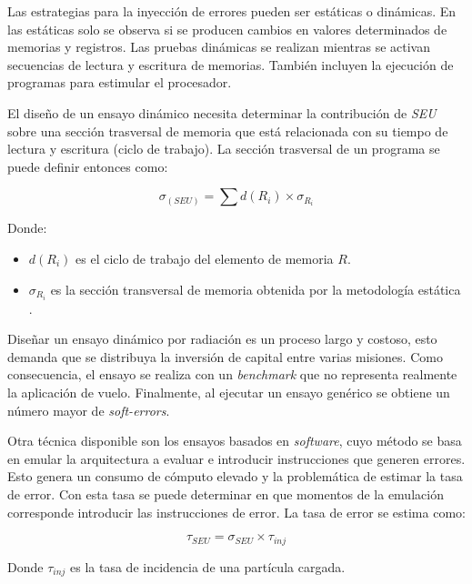 
Las estrategias para la inyección de errores pueden ser estáticas o dinámicas.
En las estáticas solo se observa si se producen cambios en valores determinados de memorias y registros.
Las pruebas dinámicas se realizan mientras se activan secuencias de lectura y escritura de memorias.
También incluyen la ejecución de programas para estimular el procesador.

El diseño de un ensayo dinámico necesita determinar la contribución de \emph{SEU} sobre una sección trasversal de memoria que está relacionada con su tiempo de lectura y escritura (ciclo de trabajo).
La sección trasversal de un programa se puede definir entonces como:

\begin{equation}
	\label{eq:crosssection}
    \sigma_{(SEU)} = \sum{d(R_i) \times \sigma_{R_i}}
\end{equation}

Donde:
\begin{itemize}
    \item $ d(R_i) $ es el ciclo de trabajo del elemento de memoria $ R $.
    \item $ \sigma_{R_i} $ es la sección transversal de memoria obtenida por la metodología estática \citep{ARTICLE:velazco}.
\end{itemize}

Diseñar un ensayo dinámico por radiación es un proceso largo y costoso, esto demanda que se distribuya la inversión de capital entre varias misiones.
Como consecuencia, el ensayo se realiza con un \emph{benchmark} que no representa realmente la aplicación de vuelo.
Finalmente, al ejecutar un ensayo genérico se obtiene un número mayor de \emph{soft-errors}.

Otra técnica disponible son los ensayos basados en \emph{software}, cuyo método se basa en emular la arquitectura a evaluar e introducir instrucciones que generen errores.
Esto genera un consumo de cómputo elevado y la problemática de estimar la tasa de error.
Con esta tasa se puede determinar en que momentos de la emulación corresponde introducir las instrucciones de error.
La tasa de error se estima como:

\begin{equation}
	\label{eq:errorrate}
    \tau_{SEU} = \sigma_{SEU} \times \tau_{inj}
\end{equation}

Donde $ \tau_{inj} $ es la tasa de incidencia de una partícula cargada.

